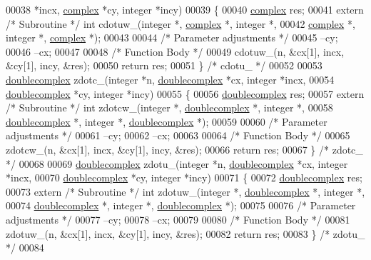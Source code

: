 \begin{DoxyCode}
00038     *incx, \hyperlink{structcomplex}{complex} *cy, integer *incy)
00039 \{
00040     \hyperlink{structcomplex}{complex} res;
00041     \textcolor{keyword}{extern} \textcolor{comment}{/* Subroutine */} \textcolor{keywordtype}{int} cdotuw\_(integer *, \hyperlink{structcomplex}{complex} *, integer *, 
00042         \hyperlink{structcomplex}{complex} *, integer *, \hyperlink{structcomplex}{complex} *);
00043 
00044     \textcolor{comment}{/* Parameter adjustments */}
00045     --cy;
00046     --cx;
00047 
00048     \textcolor{comment}{/* Function Body */}
00049     cdotuw\_(n, &cx[1], incx, &cy[1], incy, &res);
00050     \textcolor{keywordflow}{return} res;
00051 \} \textcolor{comment}{/* cdotu\_ */}
00052 
00053 \hyperlink{structdoublecomplex}{doublecomplex} zdotc\_(integer *n, \hyperlink{structdoublecomplex}{doublecomplex} *cx, integer *incx, 
00054                      \hyperlink{structdoublecomplex}{doublecomplex} *cy, integer *incy)
00055 \{
00056     \hyperlink{structdoublecomplex}{doublecomplex} res;
00057     \textcolor{keyword}{extern} \textcolor{comment}{/* Subroutine */} \textcolor{keywordtype}{int} zdotcw\_(integer *, \hyperlink{structdoublecomplex}{doublecomplex} *, integer *,
00058          \hyperlink{structdoublecomplex}{doublecomplex} *, integer *, \hyperlink{structdoublecomplex}{doublecomplex} *);
00059 
00060     \textcolor{comment}{/* Parameter adjustments */}
00061     --cy;
00062     --cx;
00063 
00064     \textcolor{comment}{/* Function Body */}
00065     zdotcw\_(n, &cx[1], incx, &cy[1], incy, &res);
00066     \textcolor{keywordflow}{return} res;
00067 \} \textcolor{comment}{/* zdotc\_ */}
00068 
00069 \hyperlink{structdoublecomplex}{doublecomplex} zdotu\_(integer *n, \hyperlink{structdoublecomplex}{doublecomplex} *cx, integer *incx, 
00070                      \hyperlink{structdoublecomplex}{doublecomplex} *cy, integer *incy)
00071 \{
00072     \hyperlink{structdoublecomplex}{doublecomplex} res;
00073     \textcolor{keyword}{extern} \textcolor{comment}{/* Subroutine */} \textcolor{keywordtype}{int} zdotuw\_(integer *, \hyperlink{structdoublecomplex}{doublecomplex} *, integer *,
00074          \hyperlink{structdoublecomplex}{doublecomplex} *, integer *, \hyperlink{structdoublecomplex}{doublecomplex} *);
00075 
00076     \textcolor{comment}{/* Parameter adjustments */}
00077     --cy;
00078     --cx;
00079 
00080     \textcolor{comment}{/* Function Body */}
00081     zdotuw\_(n, &cx[1], incx, &cy[1], incy, &res);
00082     \textcolor{keywordflow}{return} res;
00083 \} \textcolor{comment}{/* zdotu\_ */}
00084 
\end{DoxyCode}
